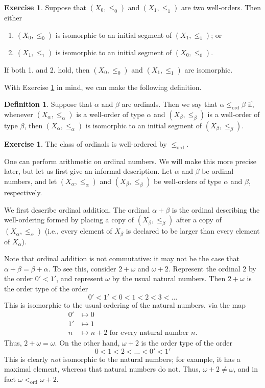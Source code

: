 \documentclass[a4paper]{memoir}
\theoremstyle{definition}
\newtheorem{definition}[theorem]{Definition}
\newtheorem{exercise}[theorem]{Exercise}
\begin{document}
\begin{exercise} \label{exercise: comp}
  Suppose that $(X_0, \leq_0)$ and $(X_1, \leq_1)$ are two well-orders. Then either
  \begin{enumerate}
    \item $(X_0, \leq_0)$ is isomorphic to an initial segment of $(X_1, \leq_1)$; or
    \item $(X_1, \leq_1)$ is isomorphic to an initial segment of $(X_0, \leq_0)$.
  \end{enumerate}
  If both 1. and 2. hold, then $(X_0, \leq_0)$ and $(X_1, \leq_1)$ are isomorphic.
\end{exercise}

With Exercise \ref{exercise: comp} in mind, we can make the following definition.

\begin{definition}
  Suppose that $\alpha$ and $\beta$ are ordinals. Then we say that $\alpha \leq_{\mathrm{ord}} 
  \beta$ if, whenever $(X_\alpha, \leq_\alpha)$ is a well-order of type $\alpha$ and 
  $(X_\beta, \leq_\beta)$ is a well-order of type $\beta$, then $(X_\alpha, \leq_\alpha)$ 
  is isomorphic to an initial segment of $(X_\beta, \leq_\beta)$.
\end{definition}

\begin{exercise}
  The class of ordinals is well-ordered by $\leq_{\mathrm{ord}}$.
\end{exercise}

One can perform arithmetic on ordinal numbers. We will make this more precise later, but let 
us first give an informal description. Let $\alpha$ and $\beta$ be ordinal numbers, 
and let $(X_\alpha, \leq_\alpha)$ and $(X_\beta, \leq_\beta)$ be well-orders of type 
$\alpha$ and $\beta$, respectively.

We first describe ordinal addition. The ordinal $\alpha + \beta$ is the 
ordinal describing the well-ordering formed by placing a copy of $(X_\beta, \leq_\beta)$ 
after a copy of $(X_\alpha, \leq_\alpha)$ (i.e., every element of $X_\beta$ is declared to 
be larger than every element of $X_\alpha$). 

Note that ordinal addition is not commutative: it may not be the case that $\alpha + \beta = 
\beta + \alpha$. To see this, consider $2 + \omega$ and $\omega + 2$. Represent the ordinal 
$2$ by the order $0' < 1'$, and represent $\omega$ by the usual natural numbers. Then 
$2 + \omega$ is the order type of the order
\[
  0' < 1' < 0 < 1 < 2 < 3 < \ldots
\]
This is isomorphic to the usual ordering of the natural numbers, via the map 
\begin{align*}
  0' & \mapsto 0 \\
  1' & \mapsto 1 \\ 
  n & \mapsto n + 2 \text{ for every natural number } n.
\end{align*}
Thus, $2 + \omega = \omega$. On the other hand, $\omega + 2$ is the order type of the order
\[
  0 < 1 < 2 < \ldots < 0' < 1'
\]
This is clearly \emph{not} isomorphic to the natural numbers; for example, it has a maximal element, 
whereas that natural numbers do not. Thus, $\omega + 2 \neq \omega$, and in fact 
$\omega <_{\mathrm{ord}} \omega + 2$.
\end{document}
